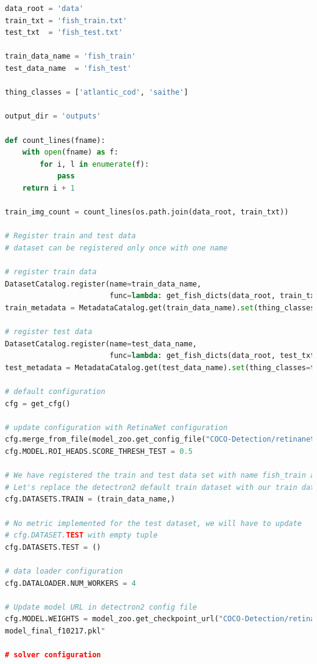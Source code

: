 \begin{lstlisting}[language=Python, caption=Konfigurasjon i train.py]
data_root = 'data'
train_txt = 'fish_train.txt'
test_txt  = 'fish_test.txt'

train_data_name = 'fish_train'
test_data_name  = 'fish_test'

thing_classes = ['atlantic_cod', 'saithe']

output_dir = 'outputs'

def count_lines(fname):
    with open(fname) as f:
        for i, l in enumerate(f):
            pass
    return i + 1

train_img_count = count_lines(os.path.join(data_root, train_txt))

# Register train and test data
# dataset can be registered only once with one name

# register train data
DatasetCatalog.register(name=train_data_name,
                        func=lambda: get_fish_dicts(data_root, train_txt))
train_metadata = MetadataCatalog.get(train_data_name).set(thing_classes=thing_classes)

# register test data
DatasetCatalog.register(name=test_data_name,
                        func=lambda: get_fish_dicts(data_root, test_txt))
test_metadata = MetadataCatalog.get(test_data_name).set(thing_classes=thing_classes)

# default configuration
cfg = get_cfg()

# update configuration with RetinaNet configuration
cfg.merge_from_file(model_zoo.get_config_file("COCO-Detection/retinanet_R_50_FPN_3x.yaml"))
cfg.MODEL.ROI_HEADS.SCORE_THRESH_TEST = 0.5

# We have registered the train and test data set with name fish_train and fish_test.
# Let's replace the detectron2 default train dataset with our train dataset.
cfg.DATASETS.TRAIN = (train_data_name,)

# No metric implemented for the test dataset, we will have to update
# cfg.DATASET.TEST with empty tuple
cfg.DATASETS.TEST = ()

# data loader configuration
cfg.DATALOADER.NUM_WORKERS = 4

# Update model URL in detectron2 config file
cfg.MODEL.WEIGHTS = model_zoo.get_checkpoint_url("COCO-Detection/retinanet_R_50_FPN_3x.yaml")
model_final_f10217.pkl"

# solver configuration


\end{lstlisting}
